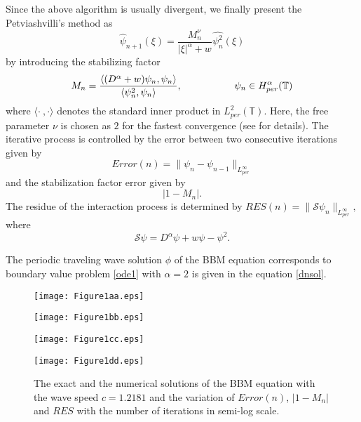 \documentclass[12pt,reqno]{amsart}
\newcommand{\2}{L^2_{per}(0, T)}
\numberwithin{equation}{section}
\numberwithin{figure}{section}
\begin{document}
\noindent Since the above algorithm is usually divergent, we finally present the Petviashvilli's method as
\begin{equation}\label{iterative2}
\widehat{\psi}_{n+1}(\xi)=\frac{M_n^{\nu}} {|\xi|^{\alpha} + w} \widehat{\psi^2_n}(\xi)
\end{equation}
by introducing the stabilizing factor
\begin{equation}\label{sf}
  M_n=\frac{\langle({D}^{\alpha} +w )\psi_n, \psi_n \rangle}{\langle\psi^2_n, \psi_n\rangle},~~~~~~~~~~ \hspace*{20pt} \psi_n\in H^{\alpha}_{per}(\mathbb{T})
\end{equation}
 where $\langle\cdot ~, \cdot \rangle $ denotes the standard inner product in $L^2_{per} (\mathbb{T})$. Here, the free parameter $\nu$ is chosen as $2$ for the fastest convergence (see \cite{PS} for details).
\noindent
The iterative process is controlled by the error between two consecutive iterations given by
$$
  Error(n)=\|\psi_n-\psi_{n-1}\|_{L_{per}^{\infty}}
$$
and the stabilization factor error given by
$$
|1-M_n|. $$ The residue of the interaction process is determined by
$
{RES(n)}= \|{ \mathcal{S}} \psi_n\|_{L_{per}^{\infty}},
$
where
$$
{ \mathcal{S}}\psi={D}^{\alpha} \psi +w \psi -\psi^2.  $$


\indent The periodic traveling wave solution $\phi$ of the BBM equation  corresponds to boundary value problem \eqref{ode1} with $\alpha=2$  is given in the equation  \eqref{dnsol}.

\begin{figure}[h]
 \begin{minipage}[t]{0.40\linewidth}
   \texttt{[image: Figure1aa.eps]}
 \end{minipage}
\hspace{30pt}
\begin{minipage}[t]{0.40\linewidth}
   \texttt{[image: Figure1bb.eps]}
 \end{minipage}
 \hspace{30pt}
\begin{minipage}[t]{0.40\linewidth}
   \texttt{[image: Figure1cc.eps]}
 \end{minipage}
 \hspace{30pt}
\begin{minipage}[t]{0.40\linewidth}
   \texttt{[image: Figure1dd.eps]}
 \end{minipage}
  \caption{The exact and the numerical solutions of  the BBM equation with the wave speed $c=1.2181$  and  the variation of  \mbox{$Error(n)$}, $|1-M_n|$ and $RES$ with the number of iterations in semi-log scale.}
 \label{dif_er}
\end{figure}
\end{document}
